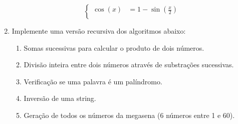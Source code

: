 \documentclass[12pt]{article}
\begin{document}
\begin{enumerate}[label=\textbf{Q\arabic*}]
\[\begin{cases}
                  \cos(x) & = 1 - \sin\left(\frac{x}{2}\right)                                                                                   \\
              \end{cases}
          \]
    \item Implemente uma versão recursiva dos algoritmos abaixo:
          \begin{enumerate}
              \item Somas sucessivas para calcular o produto de dois números.
              \item Divisão inteira entre dois números através de substrações sucessivas.
              \item Verificação se uma palavra é um palíndromo.
              \item Inversão de uma string.
              \item Geração de todos os números da megasena (6 números entre 1 e 60).
          \end{enumerate}
\end{enumerate}
\end{document}
